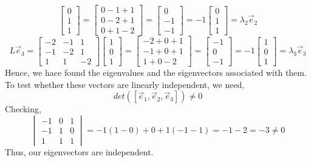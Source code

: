 \documentclass[letterpaper,10pt]{article}
\begin{document}
\begin{description}
\[\begin{bmatrix}
0\\
1\\
1
\end{bmatrix}=\begin{bmatrix}
0-1+1\\
0-2+1\\
0+1-2
\end{bmatrix}=\begin{bmatrix}
0\\
-1\\
-1
\end{bmatrix}=-1\begin{bmatrix}
0\\
1\\
1
\end{bmatrix}=\lambda_2\vec{e}_2 \]
\[L\vec{e}_3=\begin{bmatrix}
-2 & -1 & 1\\
-1 & -2 & 1\\
1 & 1 & -2
\end{bmatrix}\begin{bmatrix}
1\\
0\\
1
\end{bmatrix}=\begin{bmatrix}
-2+0+1\\
-1+0+1\\
1+0-2
\end{bmatrix}=\begin{bmatrix}
-1\\
0\\
-1
\end{bmatrix}=-1\begin{bmatrix}
1\\
0\\
1
\end{bmatrix}=\lambda_3\vec{e}_3 \]
Hence, we hace found the eigenvalues and the eigenvectors associated with them. To test whether these vectors are linearly independent, we need,
\[det([\vec{e}_1,\vec{e}_2,\vec{e}_3])\neq 0\]
Checking,
\[\begin{vmatrix}
-1 & 0 & 1\\
-1 & 1 & 0\\
1 & 1 & 1
\end{vmatrix}=-1(1-0)+0+1(-1-1)=-1-2=-3\neq 0\]
Thus, our eigenvectors are independent.
\end{description}
\end{document}

